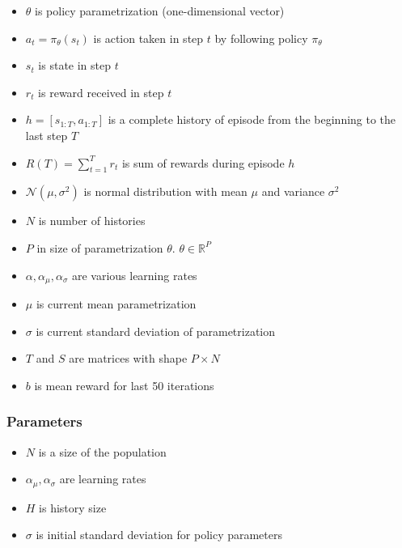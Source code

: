 \documentclass[12pt]{article}
\begin{document}
\begin{itemize}

\item $\theta$ is policy parametrization (one-dimensional vector)

\item $a_t = \pi_\theta(s_t)$ is action taken in step $t$ by following policy $\pi_\theta$

\item $s_t$ is state in step $t$

\item $r_t$ is reward received in step $t$

\item $h = [s_{1:T}, a_{1:T}]$ is a complete history of episode from the beginning to the last step $T$
\item $R(T) = \sum_{t=1}^{T} r_t$ is sum of rewards during episode $h$

\item $\mathcal{N}(\mu, \sigma^2)$ is normal distribution with mean $\mu$ and variance $\sigma^2$

\item $N$ is number of histories
\item $P$ in size of parametrization $\theta$. $\theta \in \mathbb{R}^P$

\item $\alpha, \alpha_\mu, \alpha_\sigma$ are various learning rates

\item $\mu$ is current mean parametrization
\item $\sigma$ is current standard deviation of parametrization

\item $T$ and $S$ are matrices with shape $P\times N$

\item $b$ is mean reward for last 50 iterations

\end{itemize}

\subsubsection{Parameters}

\begin{itemize}
\item $N$ is a size of the population
\item $\alpha_\mu, \alpha_\sigma$ are learning rates
\item $H$ is history size
\item $\sigma$ is initial standard deviation for policy parameters

\end{itemize}
\end{document}
